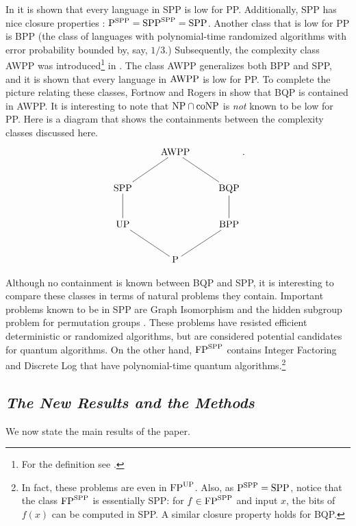 \documentclass{article}
\newcommand{\FP}{{\rm FP}}
\newcommand{\NP}{{\rm NP}}
\newcommand{\p}{{\rm P}}
\newcommand{\UP}{{\rm UP}}
\newcommand{\coNP}{\mbox{{\rm coNP}}}
\newcommand{\SPP}{{\rm SPP}}
\newcommand{\AWPP}{{\rm AWPP}}
\theoremstyle{definition}\newtheorem{remark}[theorem]{Remark}
\begin{document}
In \cite{fenner91gapdefinable} it is shown that every language in SPP
is low for PP. Additionally, SPP has nice closure properties
\cite{fenner91gapdefinable}: $\p^{\SPP}=\SPP^{\SPP}=\SPP$.  Another
class that is low for PP \cite{kobler92turing} is BPP (the class of
languages with polynomial-time randomized algorithms with error
probability bounded by, say, $1/3$.) Subsequently, the complexity
class AWPP was introduced\footnote{For the definition see
  \cite{fenner93oracle}.} in \cite{fenner93oracle}.  The class AWPP
generalizes both BPP and SPP, and it is shown that every language in
$\AWPP$ is low for PP. To complete the picture relating these classes,
Fortnow and Rogers in \cite{fortnow98complexity} show that BQP is
contained in AWPP. It is interesting to note that $\NP\cap\coNP$ is
\emph{not} known to be low for PP. Here is a diagram that shows the
containments between the complexity classes discussed here.
\[
\xymatrix{
  &\textrm{AWPP}& \\
  \textrm{SPP} \ar@{-}[ur] & & \ar@{-}[ul]\textrm{BQP} \\
  \textrm{UP}  \ar@{-}[u]  & & \ar@{-}[u] \textrm{BPP}\\
  & \ar@{-}[ur] \textrm{P} \ar@{-}[ul] & }.
\]

Although no containment is known between BQP and SPP, it is
interesting to compare these classes in terms of natural problems they
contain. Important problems known to be in SPP are Graph Isomorphism
and the hidden subgroup problem for permutation groups
\cite{arvind2002graph}.  These problems have resisted efficient
deterministic or randomized algorithms, but are considered potential
candidates for quantum algorithms. On the other hand, $\FP^{\SPP}$
contains Integer Factoring and Discrete Log that have polynomial-time
quantum algorithms.\footnote{ In fact, these problems are even in
  $\FP^{\UP}$.  Also, as $\p^{\SPP}=\SPP$, notice that the class
  $\FP^{\SPP}$ is essentially SPP: for $f\in\FP^{\SPP}$ and input $x$,
  the bits of $f(x)$ can be computed in SPP. A similar closure
  property holds for BQP.}

\subsection{\it The New Results and the Methods}

We now state the main results of the paper.
\end{document}
